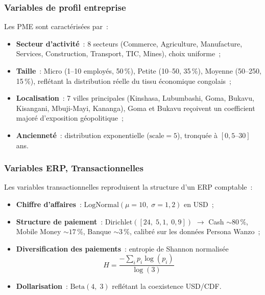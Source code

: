 \documentclass[12pt, a4paper, twocolumn]{article}
\begin{document}
\subsubsection{Variables de profil entreprise}
\label{subsubsec:profil}

Les PME sont caractérisées par~:
\begin{itemize}[leftmargin=*]
  \item \textbf{Secteur d'activité}~: 8 secteurs (Commerce, Agriculture, Manufacture, Services, Construction, Transport, TIC, Mines), choix uniforme~;
  \item \textbf{Taille}~: Micro (1--10 employés, 50\,\%), Petite (10--50, 35\,\%), Moyenne (50--250, 15\,\%), reflétant la distribution réelle du tissu économique congolais~;
  \item \textbf{Localisation}~: 7 villes principales (Kinshasa, Lubumbashi, Goma, Bukavu, Kisangani, Mbuji-Mayi, Kananga), Goma et Bukavu reçoivent un coefficient majoré d'exposition géopolitique~;
  \item \textbf{Ancienneté}~: distribution exponentielle ($\text{scale}=5$), tronquée à $[0{,}5\text{--}30]$ ans.
\end{itemize}

\subsubsection{Variables ERP, Transactionnelles}
\label{subsubsec:erp_transac}

Les variables transactionnelles reproduisent la structure d'un ERP comptable~:
\begin{itemize}[leftmargin=*]
  \item \textbf{Chiffre d'affaires}~: $\text{LogNormal}(\mu=10,\;\sigma=1{,}2)$ en USD~;
  \item \textbf{Structure de paiement}~: $\text{Dirichlet}([24,\;5{,}1,\;0{,}9])$ $\rightarrow$ Cash ${\sim}80\,\%$, Mobile Money ${\sim}17\,\%$, Banque ${\sim}3\,\%$, calibré sur les données Persona Wanzo~;
  \item \textbf{Diversification des paiements}~: entropie de Shannon normalisée
  \begin{equation}
  \label{eq:entropy_payment}
    H = \frac{-\sum_{i} p_i \log(p_i)}{\log(3)}
  \end{equation}
  \item \textbf{Dollarisation}~: $\text{Beta}(4,\;3)$ reflétant la coexistence USD/CDF.
\end{itemize}
\end{document}

